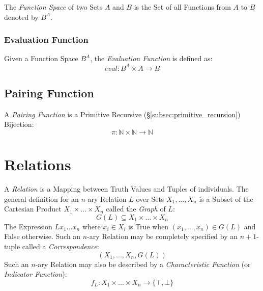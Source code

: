 \documentclass{article}
\begin{document}
The \emph{Function Space} of two Sets $A$ and $B$ is the Set of all
Functions from $A$ to $B$ denoted by $B^A$.



\subsubsection{Evaluation Function}\label{subsec:evaluation_function}

Given a Function Space $B^A$, the \emph{Evaluation Function} is
defined as:
\[
    eval : B^A \times A \rightarrow B
\]



\subsection{Pairing Function}\label{subsec:pairing_function}

A \emph{Pairing Function} is a Primitive Recursive
(\S\ref{subsec:primitive_recursion}) Bijection:
\[
    \pi : \mathbb{N} \times \mathbb{N} \rightarrow \mathbb{N}
\]



\section{Relations}\label{sec:set_relations}

A \emph{Relation} is a Mapping between Truth Values and Tuples of
individuals. The general definition for an $n$-ary Relation $L$ over
Sets $X_1, \ldots, X_n$ is a Subset of the Cartesian Product $X_1
\times \ldots \times X_n$ called the \emph{Graph} of $L$:
\[
    G(L) \subseteq X_1 \times \ldots \times X_n
\]
The Expression $L x_1 \ldots x_n$ where $x_i \in X_i$ is True when
$(x_1, \ldots, x_n) \in G(L)$ and False otherwise. Such an $n$-ary
Relation may be completely specified by an $n + 1$-tuple called a
\emph{Correspondence}:
\[
    (X_1, \ldots, X_n, G(L))
\]
Such an $n$-ary Relation may also be described by a
\emph{Characteristic Function} (or \emph{Indicator Function}): %
\[
    f_L : X_1 \times \ldots \times X_n \rightarrow \{\top,\bot\}
\]
\end{document}
